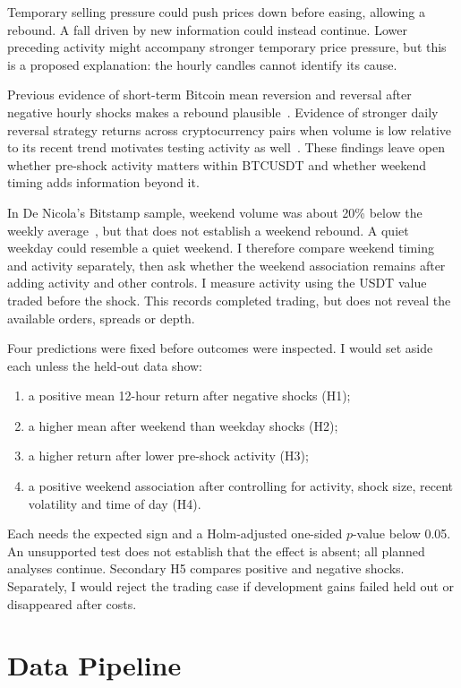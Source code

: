 \documentclass[11pt,a4paper]{article}
\begin{document}
Temporary selling pressure could push prices down before easing, allowing a rebound. A fall driven by new information could instead continue. Lower preceding activity might accompany stronger temporary price pressure, but this is a proposed explanation: the hourly candles cannot identify its cause.

Previous evidence of short-term Bitcoin mean reversion and reversal after negative hourly shocks makes a rebound plausible~\cite{denicola,miralles}. Evidence of stronger daily reversal strategy returns across cryptocurrency pairs when volume is low relative to its recent trend motivates testing activity as well~\cite{bianchi}. These findings leave open whether pre-shock activity matters within BTCUSDT and whether weekend timing adds information beyond it.

In De Nicola's Bitstamp sample, weekend volume was about 20\% below the weekly average~\cite{denicola}, but that does not establish a weekend rebound. A quiet weekday could resemble a quiet weekend. I therefore compare weekend timing and activity separately, then ask whether the weekend association remains after adding activity and other controls. I measure activity using the USDT value traded before the shock. This records completed trading, but does not reveal the available orders, spreads or depth.

Four predictions were fixed before outcomes were inspected. I would set aside each unless the held-out data show:
\begin{enumerate}[label=\arabic*)]
\item a positive mean 12-hour return after negative shocks (H1);
\item a higher mean after weekend than weekday shocks (H2);
\item a higher return after lower pre-shock activity (H3);
\item a positive weekend association after controlling for activity, shock size, recent volatility and time of day (H4).
\end{enumerate}
Each needs the expected sign and a Holm-adjusted one-sided $p$-value below 0.05. An unsupported test does not establish that the effect is absent; all planned analyses continue. Secondary H5 compares positive and negative shocks. Separately, I would reject the trading case if development gains failed held out or disappeared after costs.

\newpage
\section{Data Pipeline}
\end{document}
